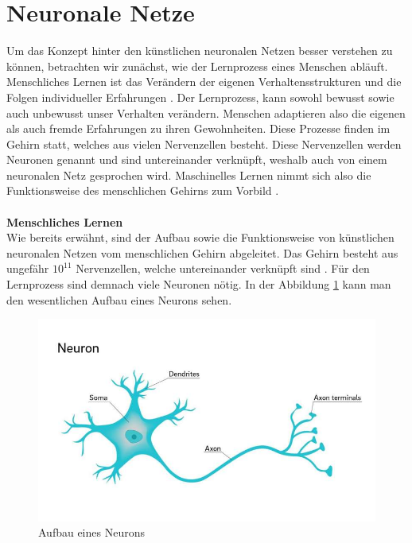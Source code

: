   \section{Neuronale Netze}\label{s.neuronalenetze}
Um das Konzept hinter den künstlichen neuronalen Netzen besser verstehen zu können, betrachten wir zunächst, wie der Lernprozess eines Menschen abläuft. Menschliches Lernen ist das Verändern der eigenen Verhaltensstrukturen und die Folgen individueller Erfahrungen \cite{hoffmann2016lern}. Der Lernprozess, kann sowohl bewusst sowie auch unbewusst unser Verhalten verändern. Menschen adaptieren also die eigenen als auch fremde Erfahrungen zu ihren Gewohnheiten. Diese Prozesse finden im Gehirn statt, welches aus vielen Nervenzellen besteht. Diese Nervenzellen werden Neuronen genannt und sind untereinander verknüpft, weshalb auch von einem neuronalen Netz gesprochen wird. Maschinelles Lernen nimmt sich also die Funktionsweise des menschlichen Gehirns zum Vorbild \cite[]{ertel2013grundkurs}.\\\\
\textbf{Menschliches Lernen}\\
Wie bereits erwähnt, sind der Aufbau sowie die Funktionsweise von künstlichen neuronalen Netzen vom menschlichen Gehirn abgeleitet. Das Gehirn besteht aus ungefähr $10^{11}$ Nervenzellen, welche untereinander verknüpft sind \cite[265ff.]{ertel2013grundkurs}. Für den Lernprozess sind demnach viele Neuronen nötig. In der Abbildung \ref{img:neuron} kann man den wesentlichen Aufbau eines Neurons sehen.
\begin{figure}
	[h]
	\centering
	\includegraphics[scale=0.7]{Sources/neuron.jpg}
	\caption{Aufbau eines Neurons \cite{neuron2018UoC}}
	\label{img:neuron}
\end{figure}\\

